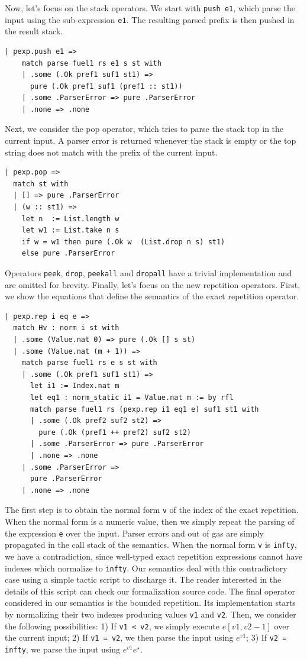 \documentclass[preprint,12pt]{elsarticle}
\theoremstyle{definition}
\begin{document}
Now, let's focus on the stack operators. We start with \lstinline|push e1|, which
parse the input using the sub-expression \lstinline|e1|. The resulting parsed prefix
is then pushed in the result stack.
\begin{lstlisting}
| pexp.push e1 =>
    match parse fuel1 rs e1 s st with
    | .some (.Ok pref1 suf1 st1) =>
      pure (.Ok pref1 suf1 (pref1 :: st1))
    | .some .ParserError => pure .ParserError
    | .none => .none
\end{lstlisting}
Next, we consider the pop operator, which tries to parse the stack top in the current
input. A parser error is returned whenever the stack is empty or the top string does
not match with the prefix of the current input.
\begin{lstlisting}
| pexp.pop =>
  match st with
  | [] => pure .ParserError
  | (w :: st1) =>
    let n  := List.length w
    let w1 := List.take n s
    if w = w1 then pure (.Ok w  (List.drop n s) st1)
    else pure .ParserError
\end{lstlisting}
Operators \lstinline|peek|, \lstinline|drop|, \lstinline|peekall| and \lstinline|dropall|
have a trivial implementation and are omitted for brevity. Finally, let's focus on
the new repetition operators. First, we show the equations that define
the semantics of the exact repetition operator.
\begin{lstlisting}
| pexp.rep i eq e =>
  match Hv : norm i st with
  | .some (Value.nat 0) => pure (.Ok [] s st)
  | .some (Value.nat (m + 1)) =>
    match parse fuel1 rs e s st with
    | .some (.Ok pref1 suf1 st1) =>
      let i1 := Index.nat m
      let eq1 : norm_static i1 = Value.nat m := by rfl
      match parse fuel1 rs (pexp.rep i1 eq1 e) suf1 st1 with
      | .some (.Ok pref2 suf2 st2) =>
        pure (.Ok (pref1 ++ pref2) suf2 st2)
      | .some .ParserError => pure .ParserError
      | .none => .none
    | .some .ParserError =>
      pure .ParserError
    | .none => .none
\end{lstlisting}
The first step is to obtain the normal form \lstinline|v| of the index of the
exact repetition. When the normal form is a numeric value, then we simply repeat
the parsing of the expression \lstinline|e| over the input. Parser errors and
out of gas are simply propagated in the call stack of the semantics. When the
normal form \lstinline|v| is \lstinline|infty|, we have a contradiction, since
well-typed exact repetition expressions cannot have indexes which normalize to
\lstinline|infty|. Our semantics deal with this contradictory case using a
simple tactic script to discharge it. The reader interested in the details of
this script can check our formalization source code.
The final operator considered in our semantics is the bounded repetition. Its
implementation starts by normalizing their two indexes producing values
\lstinline|v1| and \lstinline|v2|. Then, we consider the following possibilities:
1) If \lstinline|v1 < v2|, we simply execute $e[v1, v2 - 1]$ over the current input;
2) If \lstinline|v1 = v2|, we then parse the input using $e^{v1}$;
3) If \lstinline|v2 = infty|, we parse the input using $e^{v1}e^\star$.
\end{document}
